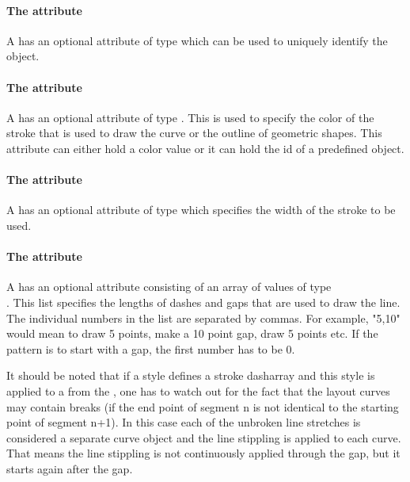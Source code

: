 \paragraph{The \fixttspace{} attribute}

A \GraphicalPrimitiveOneD has an optional attribute  of type
 which can be used to uniquely identify the object.

\paragraph{The \fixttspace{} attribute}

A \GraphicalPrimitiveOneD has an optional attribute  of
type . This is used to specify the color of the stroke that is used to draw the curve 
or the outline of geometric shapes. This 
attribute can either hold a color value or it can hold the id of a predefined
\ColorDefinition object.

\paragraph{The \fixttspace{} attribute}

A \GraphicalPrimitiveOneD has an optional attribute 
of type  which specifies the width of the stroke to be used.

\paragraph{The \fixttspace{} attribute}

A \GraphicalPrimitiveOneD has an optional attribute
 consisting of an array of values of type \\ . This list specifies the lengths of dashes and 
gaps that are used to draw the line. The individual numbers in the list are separated by commas. 
For example,  "5,10" would mean to draw 5 points, make a 10 point gap, draw 5 points etc. If the pattern is to start with a gap, the first number has to be 0.

It should be noted that if a style defines a stroke dasharray and this style is applied to a  from the \LayoutPackage, one has to watch out for the fact that the layout curves may contain breaks (if the end point of segment n is not identical to the starting point of segment n+1). In this case each of the unbroken line stretches is considered a separate curve object and the line stippling is applied to each curve. That means the line stippling is not continuously applied through the gap, but it starts again after the gap.


